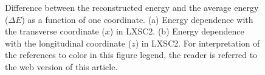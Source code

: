 \documentclass[review]{elsarticle}
\begin{document}
\begin{figure}[!htb]
	\centering		
	\caption{\label{fig.energyDep2} Difference between the reconstructed energy and the average energy ($\Delta E$) as a function of one coordinate. (a) Energy dependence with the transverse coordinate ($x$) in LXSC2. (b) Energy dependence with the longitudinal coordinate ($z$) in LXSC2. For interpretation of the references to color in this figure legend, the reader is referred to the web version of this article.}
\end{figure}
\end{document}

